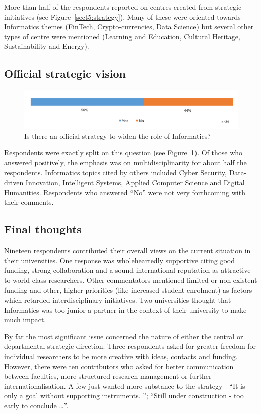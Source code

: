More than half of the respondents reported on centres created from strategic initiatives (see Figure~\ref{sect5:strategy}). Many of these were oriented towards Informatics themes (FinTech, Crypto-currencies, Data Science) but several other types of centre were mentioned (Learning and Education, Cultural Heritage, Sustainability and Energy).

\subsection{Official strategic vision}
\begin{figure}[h]
\centering
\includegraphics[width = \linewidth]{charts/5i.png}
\caption{Is there an official strategy to widen the role of Informatics?}
\label{sect5:official}
\end{figure}

Respondents were exactly split on this question (see Figure~\ref{sect5:official}). Of those who answered positively, the emphasis was on multidisciplinarity for about half the respondents. Informatics topics cited by others included Cyber Security, Data-driven Innovation, Intelligent Systems, Applied Computer Science and Digital Humanities. Respondents who answered ``No'' were not very forthcoming with their comments.

\subsection{Final thoughts}

Nineteen respondents contributed their overall views on the current situation in their universities. One response was wholeheartedly supportive citing good funding, strong collaboration and a sound international reputation as attractive to world-class researchers. Other commentators mentioned limited or non-existent funding and other, higher priorities (like increased student enrolment) as factors which retarded interdisciplinary initiatives. Two universities thought that Informatics was too junior a partner in the context of their university to make much impact.

By far the most significant issue concerned the nature of either the central or departmental strategic direction. Three respondents asked for greater freedom for individual researchers to be more creative with ideas, contacts and funding.  However, there were ten contributors who asked for better communication between faculties, more structured research management or further internationalisation. A few just wanted more substance to the strategy - ``It is only a goal without supporting instruments. '';  ``Still under construction - too early to conclude \ldots ''.




